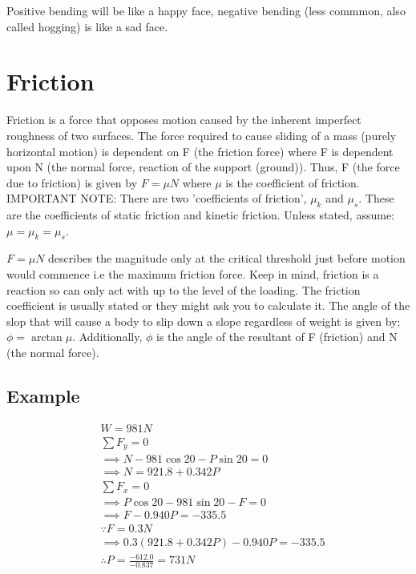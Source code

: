 \documentclass[a4paper, 12pt]{article}
\begin{document}
Positive bending will be like a happy face, negative bending (less commmon, also called hogging)
is like a sad face. 

\section{Friction} 
Friction is a force that opposes motion caused by the inherent imperfect roughness of two surfaces. 
The force required to cause sliding of a mass (purely horizontal motion) is dependent on F (the friction force)
where F is dependent upon N (the normal force, reaction of the support (ground)). Thus, F (the force due to friction) 
is given by $F=\mu N$ where $\mu$ is the coefficient of friction. IMPORTANT NOTE: There are two 'coefficients of friction', $\mu_k$ and $\mu_s$.
These are the coefficients of static friction and kinetic friction. Unless stated, assume: $\mu = \mu_k = \mu_s$.

$F = \mu N$ describes the magnitude only at the critical threshold just before motion 
would commence i.e the maximum friction force. Keep in mind, friction is a reaction so can only act with up to the level of the loading. 
The friction coefficient is usually stated or they might ask you to calculate it. The angle of the slop that will cause a body to slip down
a slope regardless of weight is given by: $\phi = \arctan{\mu}$. Additionally, $\phi$ is the angle of the resultant of F (friction) and N (the normal force). 

\subsection{Example}
\begin{align*}
    &W = 981N \\
    &\sum F_y = 0 \\
    &\implies N - 981\cos{20} - P\sin{20} = 0 \\
    &\implies N = 921.8 + 0.342P \\
    &\sum F_x = 0 \\
    &\implies P\cos{20} - 981\sin{20} - F = 0 \\
    &\implies F - 0.940P = -335.5 \\
    &\because F = 0.3N \\
    &\implies 0.3(921.8 + 0.342P) - 0.940P = -335.5 \\
    &\therefore P = \frac{-612.0}{-0.837} = 731N \\
\end{align*}
\end{document}
